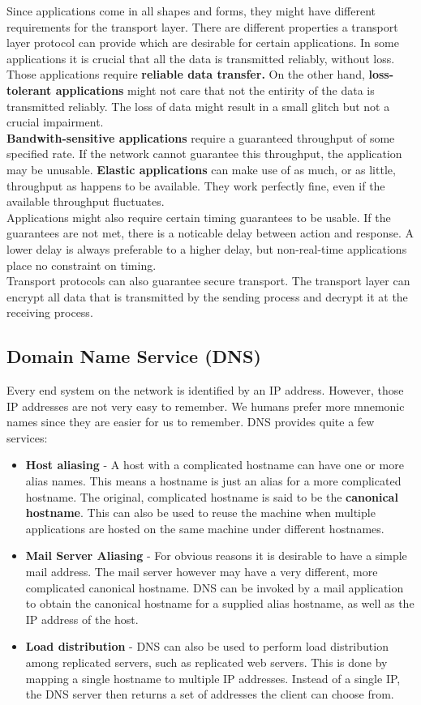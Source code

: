 Since applications come in all shapes and forms, they might have different requirements for the transport layer. There are different properties a transport layer protocol can provide which are desirable for certain applications. In some applications it is crucial that all the data is transmitted reliably, without loss. Those applications require \textbf{reliable data transfer.} On the other hand, \textbf{loss-tolerant applications} might not care that not the entirity of the data is transmitted reliably. The loss of data might result in a small glitch but not a crucial impairment.\\
\textbf{Bandwith-sensitive applications} require a guaranteed throughput of some specified rate. If the network cannot guarantee this throughput, the application may be unusable. \textbf{Elastic applications} can make use of as much, or as little, throughput as happens to be available. They work perfectly fine, even if the available throughput fluctuates.\\
Applications might also require certain timing guarantees to be usable. If the guarantees are not met, there is a noticable delay between action and response. A lower delay is always preferable to a higher delay, but non-real-time applications place no constraint on timing.\\
Transport protocols can also guarantee secure transport. The transport layer can encrypt all data that is transmitted by the sending process and decrypt it at the receiving process.

\subsection{Domain Name Service (DNS)}
Every end system on the network is identified by an IP address. However, those IP addresses are not very easy to remember. We humans prefer more mnemonic names since they are easier for us to remember. DNS provides quite a few services:
\begin{itemize}
\item \textbf{Host aliasing} - A host with a complicated hostname can have one or more alias names. This means a hostname is just an alias for a more complicated hostname. The original, complicated hostname is said to be the \textbf{canonical hostname}. This can also be used to reuse the machine when multiple applications are hosted on the same machine under different hostnames.
\item \textbf{Mail Server Aliasing} - For obvious reasons it is desirable to have a simple mail address. The mail server however may have a very different, more complicated canonical hostname. DNS can be invoked by a mail application to obtain the canonical hostname for a supplied alias hostname, as well as the IP address of the host.
\item \textbf{Load distribution} - DNS can also be used to perform load distribution among replicated servers, such as replicated web servers. This is done by mapping a single hostname to multiple IP addresses. Instead of a single IP, the DNS server then returns a set of addresses the client can choose from.
\end{itemize}

